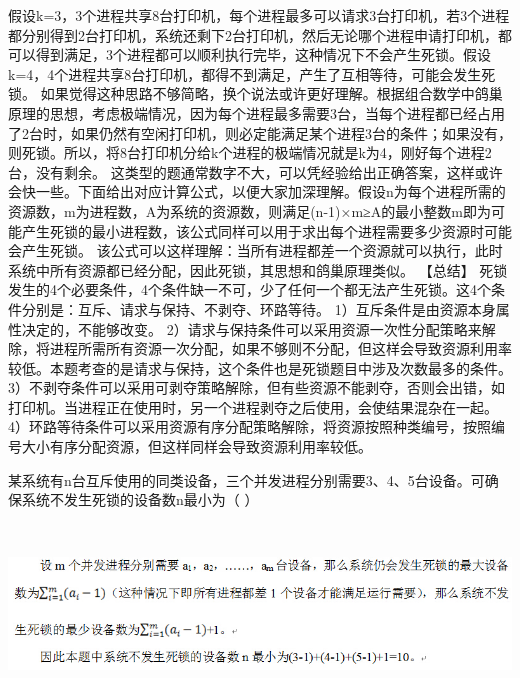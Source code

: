 \begin{solution}假设k=3，3个进程共享8台打印机，每个进程最多可以请求3台打印机，若3个进程都分别得到2台打印机，系统还剩下2台打印机，然后无论哪个进程申请打印机，都可以得到满足，3个进程都可以顺利执行完毕，这种情况下不会产生死锁。假设k=4，4个进程共享8台打印机，都得不到满足，产生了互相等待，可能会发生死锁。
如果觉得这种思路不够简略，换个说法或许更好理解。根据组合数学中鸽巢原理的思想，考虑极端情况，因为每个进程最多需要3台，当每个进程都已经占用了2台时，如果仍然有空闲打印机，则必定能满足某个进程3台的条件；如果没有，则死锁。所以，将8台打印机分给k个进程的极端情况就是k为4，刚好每个进程2台，没有剩余。
这类型的题通常数字不大，可以凭经验给出正确答案，这样或许会快一些。下面给出对应计算公式，以便大家加深理解。假设n为每个进程所需的资源数，m为进程数，A为系统的资源数，则满足(n-1)×m≥A的最小整数m即为可能产生死锁的最小进程数，该公式同样可以用于求出每个进程需要多少资源时可能会产生死锁。
该公式可以这样理解：当所有进程都差一个资源就可以执行，此时系统中所有资源都已经分配，因此死锁，其思想和鸽巢原理类似。
【总结】
死锁发生的4个必要条件，4个条件缺一不可，少了任何一个都无法产生死锁。这4个条件分别是：互斥、请求与保持、不剥夺、环路等待。
1）互斥条件是由资源本身属性决定的，不能够改变。
2）请求与保持条件可以采用资源一次性分配策略来解除，将进程所需所有资源一次分配，如果不够则不分配，但这样会导致资源利用率较低。本题考查的是请求与保持，这个条件也是死锁题目中涉及次数最多的条件。
3）不剥夺条件可以采用可剥夺策略解除，但有些资源不能剥夺，否则会出错，如打印机。当进程正在使用时，另一个进程剥夺之后使用，会使结果混杂在一起。
4）环路等待条件可以采用资源有序分配策略解除，将资源按照种类编号，按照编号大小有序分配资源，但这样同样会导致资源利用率较低。
\end{solution}
\question 某系统有n台互斥使用的同类设备，三个并发进程分别需要3、4、5台设备。可确保系统不发生死锁的设备数n最小为（
）
\par{}
\begin{solution}\includegraphics[width=8.27083in,height=1.86458in]{computerassets/596fce0cf07071e48e89e6d36a9a6089.jpeg}
\end{solution}
